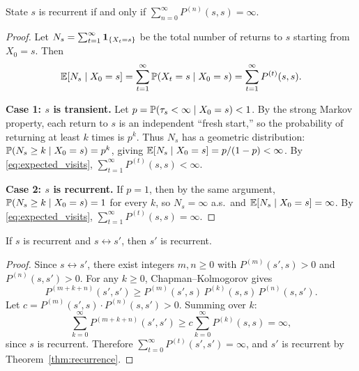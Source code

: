 \documentclass[11pt,a4paper]{article}
\begin{document}
\begin{theorem}
\label{thm:recurrence}
State $s$ is recurrent if and only if
$\sum_{n=0}^\infty P^{(n)}(s, s) = \infty$.
\end{theorem}

\begin{proof}
Let $N_s = \sum_{t=1}^\infty \mathbf{1}_{\{X_t = s\}}$ be the
total number of returns to $s$ starting from $X_0 = s$.  Then
\begin{equation}
  \mathbb{E}[N_s \mid X_0 = s]
  = \sum_{t=1}^\infty \mathbb{P}(X_t = s \mid X_0 = s)
  = \sum_{t=1}^\infty P^{(t)}(s, s).
  \label{eq:expected_visits}
\end{equation}

\textbf{Case 1: $s$ is transient.}
Let $p = \mathbb{P}(\tau_s < \infty \mid X_0 = s) < 1$.  By the
strong Markov property, each return to $s$ is an independent
``fresh start,'' so the probability of returning at least $k$
times is $p^k$.  Thus $N_s$ has a geometric distribution:
$\mathbb{P}(N_s \geq k \mid X_0 = s) = p^k$, giving
$\mathbb{E}[N_s \mid X_0 = s] = p/(1-p) < \infty$.  By
\eqref{eq:expected_visits},
$\sum_{t=1}^\infty P^{(t)}(s, s) < \infty$.

\textbf{Case 2: $s$ is recurrent.}
If $p = 1$, then by the same argument,
$\mathbb{P}(N_s \geq k \mid X_0 = s) = 1$ for every $k$, so
$N_s = \infty$ a.s.\ and
$\mathbb{E}[N_s \mid X_0 = s] = \infty$.  By
\eqref{eq:expected_visits},
$\sum_{t=1}^\infty P^{(t)}(s, s) = \infty$.

\end{proof}

\begin{proposition}
\label{prop:recurrence_class}
If $s$ is recurrent and $s \leftrightarrow s'$, then $s'$ is
recurrent.
\end{proposition}

\begin{proof}
Since $s \leftrightarrow s'$, there exist integers $m, n \geq 0$
with $P^{(m)}(s', s) > 0$ and $P^{(n)}(s, s') > 0$.  For any
$k \geq 0$, Chapman--Kolmogorov gives
\begin{equation}
  P^{(m+k+n)}(s', s')
  \geq P^{(m)}(s', s)\, P^{(k)}(s, s)\, P^{(n)}(s, s').
\end{equation}
Let $c = P^{(m)}(s', s) \cdot P^{(n)}(s, s') > 0$.  Summing
over $k$:
\begin{equation}
  \sum_{k=0}^\infty P^{(m+k+n)}(s', s')
  \geq c \sum_{k=0}^\infty P^{(k)}(s, s) = \infty,
\end{equation}
since $s$ is recurrent.  Therefore
$\sum_{t=0}^\infty P^{(t)}(s', s') = \infty$, and $s'$ is
recurrent by Theorem~\ref{thm:recurrence}.
\end{proof}
\end{document}
